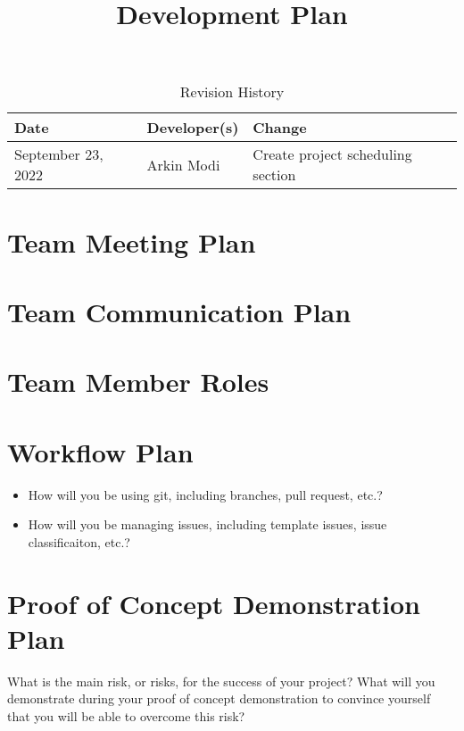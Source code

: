 \documentclass{article}
\title{Development Plan\\\progname}
\author{\authname}
\date{}
\begin{document}
\begin{table}[hp]
\caption{Revision History} \label{TblRevisionHistory}
\begin{tabularx}{\textwidth}{llX}
\toprule
\textbf{Date} & \textbf{Developer(s)} & \textbf{Change}\\
\midrule
September 23, 2022 & Arkin Modi & Create project scheduling section\\
\bottomrule
\end{tabularx}
\end{table}

\newpage

\maketitle


\section{Team Meeting Plan}

\section{Team Communication Plan}

\section{Team Member Roles}

\section{Workflow Plan}

\begin{itemize}
	\item How will you be using git, including branches, pull request, etc.?
	\item How will you be managing issues, including template issues, issue
	classificaiton, etc.?
\end{itemize}

\section{Proof of Concept Demonstration Plan}

What is the main risk, or risks, for the success of your project?  What will you
demonstrate during your proof of concept demonstration to convince yourself that
you will be able to overcome this risk?
\end{document}
